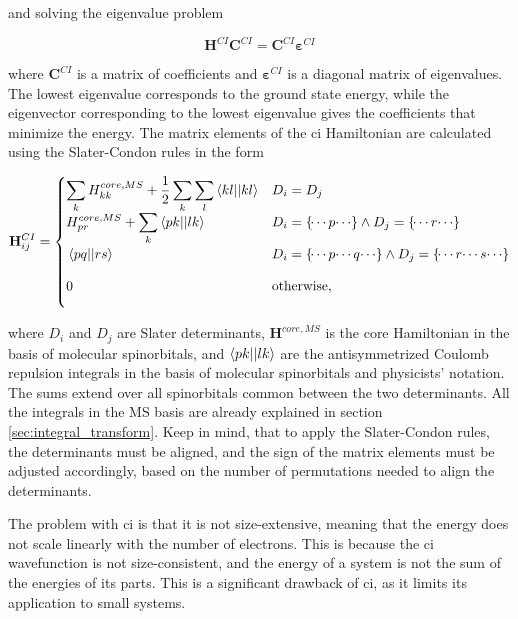 and solving the eigenvalue problem

\begin{equation}\label{eq:ci-eigenvalue-problem}
\mathbf{H}^{CI}\mathbf{C}^{CI}=\mathbf{C}^{CI}\mathbf{\varepsilon}^{CI}
\end{equation}

where \(\mathbf{C}^{CI}\) is a matrix of coefficients and \(\mathbf{\varepsilon}^{CI}\) is a diagonal matrix of eigenvalues. The lowest eigenvalue corresponds to the ground state energy, while the eigenvector corresponding to the lowest eigenvalue gives the coefficients that minimize the energy. The matrix elements of the \acrshort{ci} Hamiltonian are calculated using the Slater-Condon rules in the form

\begin{equation}\label{eq:slater-condon-rules}
\mathbf{H}_{ij}^{CI}=
\begin{cases} 
\displaystyle \sum_kH_{kk}^{core,MS}+\frac{1}{2}\sum_k\sum_l\braket{kl||kl}&D_i=D_j \\
\displaystyle H_{pr}^{core,MS}+\sum_k\braket{pk||lk}&D_i=\left\lbrace\dotsi p\dotsi\right\rbrace\land D_j=\left\lbrace\dotsi r\dotsi\right\rbrace \\
\displaystyle \vphantom{\sum_k}\braket{pq||rs}&D_i=\left\lbrace\dotsi p\dotsi q\dotsi\right\rbrace\land D_j=\left\lbrace\dotsi r\dotsi s\dotsi\right\rbrace \\
\displaystyle \vphantom{\sum_k}0&\text{otherwise},
\end{cases}
\end{equation}

where \(D_i\) and \(D_j\) are Slater determinants, \(\mathbf{H}^{core,MS}\) is the core Hamiltonian in the basis of molecular spinorbitals, and \(\braket{pk||lk}\) are the antisymmetrized Coulomb repulsion integrals in the basis of molecular spinorbitals and physicists' notation. The sums extend over all spinorbitals common between the two determinants. All the integrals in the MS basis are already explained in section \ref{sec:integral_transform}. Keep in mind, that to apply the Slater-Condon rules, the determinants must be aligned, and the sign of the matrix elements must be adjusted accordingly, based on the number of permutations needed to align the determinants.

The problem with \acrshort{ci} is that it is not size-extensive, meaning that the energy does not scale linearly with the number of electrons. This is because the \acrshort{ci} wavefunction is not size-consistent, and the energy of a system is not the sum of the energies of its parts. This is a significant drawback of \acrshort{ci}, as it limits its application to small systems.

